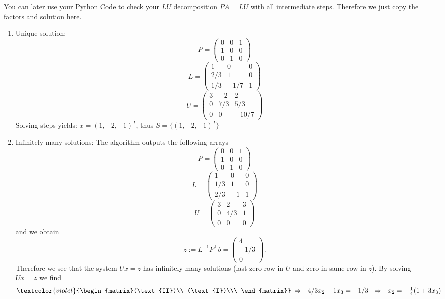 {\color{solution}
You can later use your Python Code to check your $LU$ decomposition $PA=LU$ with all intermediate steps. Therefore we just copy the factors and solution here.
\begin{enumerate}
	\item Unique solution: 
		$$P = \begin{pmatrix}
0&0&1\\1&0&0\\0&1&0
	\end{pmatrix} $$
		$$L = \begin{pmatrix}
	1&0&0\\
	2/3&1&0\\
	1/3&-1/7&1
	\end{pmatrix} $$
		$$U = \begin{pmatrix}
	3&-2&2\\
	0&7/3&5/3\\
	0&0&-10/7
	\end{pmatrix} $$
	Solving steps yields: $x = (1,-2,-1)^T$, thus $S=\{(1,-2,-1)^T\}$
	\item Infinitely many solutions: The algorithm outputs the following arrays
			$$P = \begin{pmatrix}
	0&0&1\\1&0&0\\0&1&0
	\end{pmatrix} $$
	$$L = \begin{pmatrix}
	1&0&0\\
	1/3&1&0\\
	2/3&-1&1
	\end{pmatrix} $$
		$$U = \begin{pmatrix}
		3&2&3\\
		0&4/3&1\\
		0&0&0
		\end{pmatrix} $$
		and we obtain
		$$z:= L^{-1} P^\top b = \begin{pmatrix}
		4\\ -1/3\\0
		\end{pmatrix}. $$
		Therefore we see that the system $Ux = z$ has infinitely many solutions (last zero row in $U$ and zero in same row in $z$). By solving $Ux = z$ we find
				$$
				\textcolor{violet}{\begin{matrix}(\text{II})\\ (\text{I})\\\  \end{matrix}}
				\begin{array}{l}
				\Rightarrow\ \ 4/3x_2 +1x_3 =  -1/3\ \ \Rightarrow\ \ x_2 = -\frac{1}{4}(1+3x_3)\\

\end{array}$$
\end{enumerate}}
